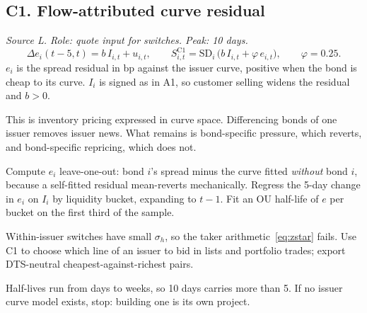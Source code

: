 \documentclass[11pt,letterpaper]{article}
\newcommand{\SD}{\mathrm{SD}}             %
\begin{document}
\subsection{C1. Flow-attributed curve residual}
\emph{Source L. Role: quote input for switches. Peak: 10 days.}
\begin{equation}
\Delta e_{i}(t-5,t)=b\,I_{i,t}+u_{i,t},\qquad
S^{\mathrm{C1}}_{i,t}=\SD_i\,\bigl(b\,I_{i,t}+\varphi\,e_{i,t}\bigr),\qquad \varphi=0.25 .
\end{equation}
$e_i$ is the spread residual in bp against the issuer curve, positive when the bond is cheap to its curve. $I_i$ is signed as in A1, so customer selling widens the residual and $b>0$.
\begin{spec}
\item[Mechanism.] This is inventory pricing expressed in curve space. Differencing bonds of one issuer removes issuer news. What remains is bond-specific pressure, which reverts, and bond-specific repricing, which does not.
\item[Build.] Compute $e_i$ leave-one-out: bond $i$'s spread minus the curve fitted \emph{without} bond $i$, because a self-fitted residual mean-reverts mechanically. Regress the 5-day change in $e_i$ on $I_i$ by liquidity bucket, expanding to $t-1$. Fit an OU half-life of $e$ per bucket on the first third of the sample.
\item[Role in the quote.] Within-issuer switches have small $\sigma_h$, so the taker arithmetic~\eqref{eq:zstar} fails. Use C1 to choose which line of an issuer to bid in lists and portfolio trades; export DTS-neutral cheapest-against-richest pairs.
\item[Decay and pitfalls.] Half-lives run from days to weeks, so 10 days carries more than 5. If no issuer curve model exists, stop: building one is its own project.
\end{spec}
\end{document}

